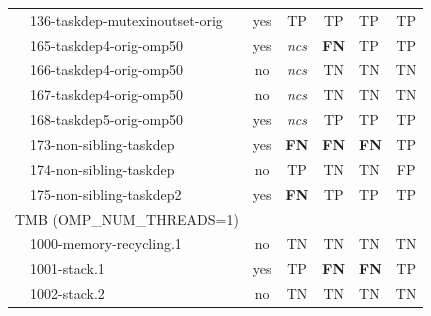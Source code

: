 \begin{table}[]
\begin{tabular}{llc|cclc}
		& 136-taskdep-mutexinoutset-orig                         & yes                   & TP                   & TP                   & TP                   & TP                     \\
		& 165-taskdep4-orig-omp50                                & yes                   & \emph{ncs}           & \textbf{FN}          & TP                   & TP                     \\
		& 166-taskdep4-orig-omp50                                & no                    & \emph{ncs}           & TN                   & TN                   & TN                     \\
		& 167-taskdep4-orig-omp50                                & no                    & \emph{ncs}           & TN                   & TN                   & TN                     \\
		& 168-taskdep5-orig-omp50                                & yes                   & \emph{ncs}           & TP                   & TP                   & TP                     \\
		& 173-non-sibling-taskdep                                & yes                   & \textbf{FN}          & \textbf{FN}          & \textbf{FN}          & TP                     \\
		& 174-non-sibling-taskdep                                & no                    & TP                   & TN                   & TN                   & FP                     \\
		& 175-non-sibling-taskdep2                               & yes                   & \textbf{FN}          & TP                   & TP                   & TP                     \\ \hline
		\multicolumn{2}{l}{TMB (OMP\_NUM\_THREADS=1)}            & \multicolumn{1}{l|}{} & \multicolumn{1}{l}{} & \multicolumn{1}{l}{} & \multicolumn{1}{c}{} & \multicolumn{1}{l}{}   \\ \hline
		& 1000-memory-recycling.1                                & no                    & TN                   & TN                   & TN                   & TN                     \\
		& 1001-stack.1                                           & yes                   & TP                   & \textbf{FN}          & \textbf{FN}          & TP                     \\
		& 1002-stack.2                                           & no                    & TN                   & TN                   & TN                   & TN                     \\

\end{tabular}
\end{table}
